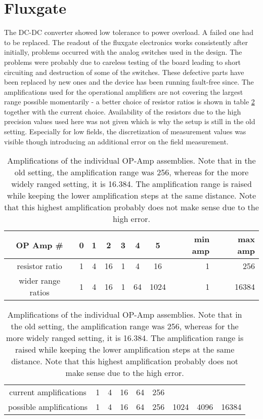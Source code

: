     \section{Fluxgate}
        The DC-DC converter showed low tolerance to power overload. A failed one had to be replaced.
        The readout of the fluxgate electronics works consistently after initially, problems occurred with the analog switches used in the design. The problems were probably due to careless testing of the board leading to short circuiting and destruction of some of the switches. These defective parts have been replaced by new ones and the device has been running fault-free since.
        The amplifications used for the operational amplifiers are not covering the largest range possible momentarily - a better choice of resistor ratios is shown in table \ref{table:discussion:amplifications} together with the current choice. Availability of the resistors due to the high precision values used here was not given which is why the setup is still in the old setting. Especially for low fields, the discretization of measurement values was visible though introducing an additional error on the field measurement.
        \begin{table}
            \centering
            \begin{tabular}{|c|ccc|ccc||rr|}
                \hline
                OP Amp \# & 0 & 1 & 2 & 3 & 4 & 5 & min amp& max amp\\
                \hline
                resistor ratio & 1 & 4 & 16 & 1 & 4 & 16 & 1 & 256\\
                wider range ratios & 1 & 4 & 16 & 1 & 64 & 1024& 1 & 16384\\
                \hline
            \end{tabular}
            \begin{tabular}{|c|cccccccc|}
                \hline
                current amplifications & 1 & 4 & 16 & 64 & 256 & & & \\
                possible amplifications & 1 & 4 & 16 & 64 & 256 & 1024 & 4096 & 16384\\
                \hline
            \end{tabular}
            \caption[OP-AMP amplifications]{Amplifications of the individual OP-Amp assemblies. Note that in the old setting, the amplification range was 256, whereas for the more widely ranged setting, it is 16.384. The amplification range is raised while keeping the lower amplification steps at the same distance. Note that this highest amplification probably does not make sense due to the high error.}
            \label{table:discussion:amplifications}
        \end{table}

